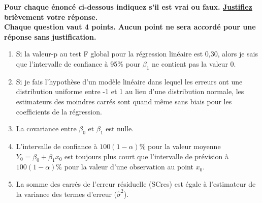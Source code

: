 \documentclass[a4paper, 11pt]{article}
\begin{document}
{\textbf{Pour chaque énoncé ci-dessous indiquez s'il est vrai ou faux. \underline{Justifiez} brièvement votre réponse. \\
Chaque question vaut 4 points. Aucun point ne sera accordé pour une réponse sans justification. }
\begin{enumerate}
\item  Si la valeur-p au test F global pour la régression linéaire est 0,30, alors je sais que l'intervalle de
confiance à 95\% pour $\beta_1$ ne contient pas la valeur 0.
\vspace{1.2 in}
\item Si je fais l'hypothèse d’un modèle linéaire dans lequel les erreurs ont une distribution uniforme entre -1 et 1 au lieu d’une distribution normale, les estimateurs des moindres carrés sont quand même sans biais pour les coefficients de la régression.
\vspace{1.2 in}
\item La covariance entre $\beta_0$ et $\beta_1$ est nulle. 
\vspace{1.2 in}
\item L'intervalle de confiance à $100(1-\alpha)\%$ pour la valeur moyenne $Y_0 = \beta_0 + \beta_1 x_0$ est toujours plus court que l'intervalle de prévision à $100(1-\alpha)\%$ pour la valeur d'une observation au point $x_0$. 
\vspace{1.2 in}
\item La somme des carrés de l’erreur résiduelle (SCres) est égale à l'estimateur de la variance des termes d’erreur ($\widehat{\sigma}^2$).

\vspace{1.2 in}
%



%


%
\end{enumerate}


\newpage


\vspace*{-0.7 in}
}
\end{document}
